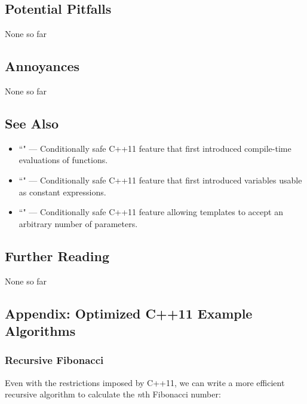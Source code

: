 \subsection[Potential Pitfalls]{Potential Pitfalls}\label{potential-pitfalls}

None so far

\subsection[Annoyances]{Annoyances}\label{annoyances}

None so far

\subsection[See Also]{See Also}\label{see-also}

\begin{itemize}
\item{``" — Conditionally safe C++11 feature that first introduced compile-time evaluations of functions.}
\item{``" — Conditionally safe C++11 feature that first introduced variables usable as constant expressions.}
\item{``" — Conditionally safe C++11 feature allowing templates to accept an arbitrary number of parameters.}
\end{itemize}

\subsection[Further Reading]{Further Reading}\label{further-reading}

None so far

\subsection[Appendix: Optimized C++11 Example Algorithms]{Appendix: Optimized C++11 Example Algorithms}\label{appendix:-optimized-c++11-example-algorithms}

\subsubsection[Recursive Fibonacci]{Recursive Fibonacci}\label{recursive-fibonacci}

Even with the restrictions imposed by C++11, we can write a
more efficient recursive algorithm to calculate the \emph{n\/}th
Fibonacci number:

